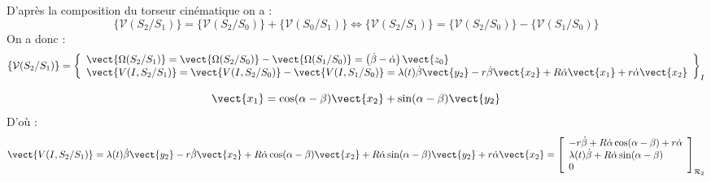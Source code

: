 \ifprof
\begin{corrige}
D'après la composition du torseur cinématique on a :
$$
\{ \mathcal{V}(S_2/S_1)\} = \{ \mathcal{V}(S_2/S_0)\} + \{ \mathcal{V}(S_0/S_1)\} 
\Longleftrightarrow \{ \mathcal{V}(S_2/S_1)\} = \{ \mathcal{V}(S_2/S_0)\} - \{ \mathcal{V}(S_1/S_0)\} 
$$
On a donc : 
$$
\{ \mathcal{V}(S_2/S_1)\} =
\left\{
\begin{array}{l}
\vect{\Omega(S_2/S_1)} = \vect{\Omega(S_2/S_0)} - \vect{\Omega(S_1/S_0)}  = \left(\dot{\beta}-\dot{\alpha} \right)\vect{z_0} \\
\vect{V(I,S_2/S_1)} = \vect{V(I,S_2/S_0)} - \vect{V(I,S_1/S_0)} 
=
 \lambda(t) \dot{\beta}\vect{y_2} - r\dot{\beta}\vect{x_2} +
 R\dot{\alpha}\vect{x_1} + r\dot{\alpha}\vect{x_2}
\end{array}
\right\}_I
$$


$$ \vect{x_1} 
=\cos(\alpha-\beta)\vect{x_2} + \sin(\alpha-\beta)\vect{y_2}
$$
D'où :
$$
\vect{V(I,S_2/S_1)} =
 \lambda(t) \dot{\beta}\vect{y_2} - r\dot{\beta}\vect{x_2} +
 R\dot{\alpha}\cos(\alpha-\beta)\vect{x_2} +  R\dot{\alpha}\sin(\alpha-\beta)\vect{y_2} + r\dot{\alpha}\vect{x_2}
=\left[
\begin{array}{l}
- r\dot{\beta}+ R\dot{\alpha}\cos(\alpha-\beta) + r\dot{\alpha}\\
 \lambda(t) \dot{\beta}+  R\dot{\alpha}\sin(\alpha-\beta)\\
0\\
\end{array}
\right]_{\mathcal{R}_2}
$$

\end{corrige}
\else
\fi



